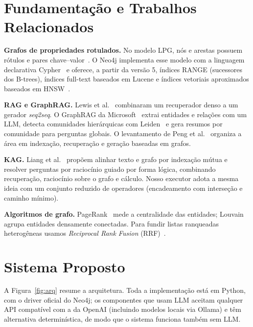 \documentclass[12pt]{article}
\begin{document}
\section{Fundamentação e Trabalhos Relacionados}

\textbf{Grafos de propriedades rotulados.} No modelo LPG, nós e arestas possuem rótulos e pares chave--valor~\cite{angles2018pgm}. O Neo4j implementa esse modelo com a linguagem declarativa Cypher~\cite{robinson2015graphdb} e oferece, a partir da versão 5, índices RANGE (sucessores dos B-trees), índices full-text baseados em Lucene e índices vetoriais aproximados baseados em HNSW~\cite{malkov2020hnsw}.

\textbf{RAG e GraphRAG.} Lewis et al.~\cite{lewis2020rag} combinaram um recuperador denso a um gerador \textit{seq2seq}. O GraphRAG da Microsoft~\cite{edge2024graphrag} extrai entidades e relações com um LLM, detecta comunidades hierárquicas com Leiden~\cite{traag2019leiden} e gera resumos por comunidade para perguntas globais. O levantamento de Peng et al.~\cite{peng2024graphragsurvey} organiza a área em indexação, recuperação e geração baseadas em grafos.

\textbf{KAG.} Liang et al.~\cite{liang2024kag} propõem alinhar texto e grafo por indexação mútua e resolver perguntas por raciocínio guiado por forma lógica, combinando recuperação, raciocínio sobre o grafo e cálculo. Nosso executor adota a mesma ideia com um conjunto reduzido de operadores (encadeamento com interseção e caminho mínimo).

\textbf{Algoritmos de grafo.} PageRank~\cite{page1999pagerank} mede a centralidade das entidades; Louvain~\cite{blondel2008louvain} agrupa entidades densamente conectadas. Para fundir listas ranqueadas heterogêneas usamos \textit{Reciprocal Rank Fusion} (RRF)~\cite{cormack2009rrf}.

\section{Sistema Proposto}

A Figura~\ref{fig:arq} resume a arquitetura. Toda a implementação está em Python, com o driver oficial do Neo4j; os componentes que usam LLM aceitam qualquer API compatível com a da OpenAI (incluindo modelos locais via Ollama) e têm alternativa determinística, de modo que o sistema funciona também sem LLM.
\end{document}
